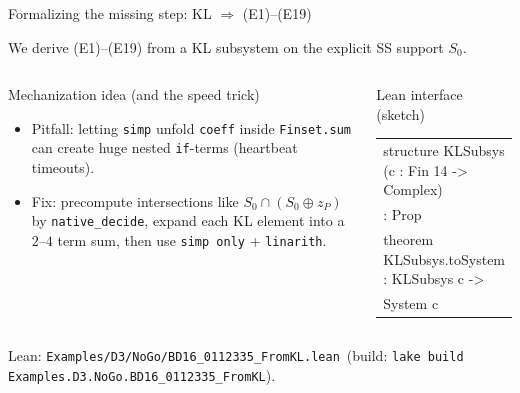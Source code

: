 \documentclass[aspectratio=169,t,10pt]{beamer}
\newcommand{\code}[1]{\texttt{\small #1}}
\begin{document}
\begin{frame}{Formalizing the missing step: KL $\Rightarrow$ (E1)--(E19)}

We derive (E1)--(E19) from a KL subsystem on the explicit SS support $S_0$.

\begin{columns}[T,onlytextwidth]
\begin{block}{Mechanization idea (and the speed trick)}
\footnotesize
\begin{itemize}\setlength\itemsep{1pt}
\item Pitfall: letting \code{simp} unfold \code{coeff} inside \code{Finset.sum} can create huge nested \code{if}-terms (heartbeat timeouts).
\item Fix: precompute intersections like $S_0\cap(S_0\oplus z_P)$ by \code{native\_decide}, expand each KL element into a $2$--$4$ term sum, then use \code{simp only} + \code{linarith}.
\end{itemize}
\end{block}

\begin{exampleblock}{Lean interface (sketch)}
{\tiny\ttfamily
\begin{tabular}{@{}l@{}}
structure KLSubsys (c : Fin 14 -> Complex)\\
: Prop\\
theorem KLSubsys.toSystem : KLSubsys c ->\\
\quad System c
\end{tabular}
}
\end{exampleblock}
\end{columns}

\textcolor{Slate}{\scriptsize Lean: \code{Examples/D3/NoGo/BD16\_0112335\_FromKL.lean} \,(build: \code{lake build Examples.D3.NoGo.BD16\_0112335\_FromKL}).}
\end{frame}
\end{document}
